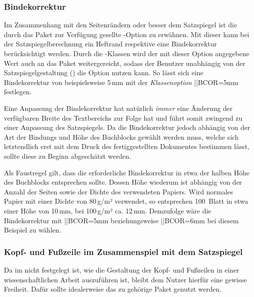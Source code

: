 \begin{DeclareEntity*}{}
\begin{DeclareEntity*}{}
\begin{DeclareEntity*}{}
\subsubsection{%
  Bindekorrektur%
}
%
Im Zusammenhang mit den Seitenrändern oder besser dem Satzspiegel ist die durch 
das Paket  zur Verfügung gesellte \KOMAScript-Option 
 zu erwähnen. Mit dieser kann bei 
der Satzspiegelberechnung ein Heftrand respektive eine Bindekorrektur 
berücksichtigt werden. Durch die \TUDScript-Klassen wird der mit dieser Option 
angegebene Wert auch an das Paket  weitergereicht, sodass der 
Benutzer unabhängig von der Satzspiegelgestaltung () die 
Option  nutzen kann. So lässt sich eine Bindekorrektur von 
beispielsweise 5\,mm mit der \emph{Klassenoption} \Option||{BCOR=5mm} 
festlegen.

Eine Anpassung der Bindekorrektur hat natürlich \emph{immer} eine Änderung der 
verfügbaren Breite des Textbereichs zur Folge hat und führt somit zwingend zu 
einer Anpassung des Satzspiegels. Da die Bindekorrektur jedoch abhängig von der 
Art der Bindungs und Höhe des Buchblocks gewählt werden muss, welche sich 
letztendlich erst mit dem Druck des fertiggestellten Dokumentes bestimmen 
lässt, sollte diese zu Beginn abgeschätzt werden.
%
\begin{Example}
Als Faustregel gilt, dass die erforderliche Bindekorrektur in etwa der halben 
Höhe des Buchblocks entsprechen sollte. Dessen Höhe wiederum ist abhängig von 
der Anzahl der Seiten sowie der Dichte des verwendeten Papiers. Wird normales 
Papier mit einer Dichte von 80\,g/m² verwendet, so entsprechen 100~Blatt 
in etwa einer Höhe von 10\,mm, bei 100\,g/m² ca. 12\,mm. Demzufolge wäre die 
Bindekorrektur mit \Option||{BCOR=5mm} beziehungsweise \Option||{BCOR=6mm} bei 
diesem Beispiel zu wählen.%
\end{Example}



\subsubsection{%
  Kopf- und Fußzeile im Zusammenspiel mit dem Satzspiegel%
}
%
Da im \CD nicht festgelegt ist, wie die Gestaltung der Kopf- und Fußzeilen in 
einer wissenschaftlichen Arbeit auszuführen ist, bleibt dem Nutzer hierfür eine 
gewisse Freiheit. Dafür sollte idealerweise das zu \KOMAScript gehörige Paket 
 genutzt werden. 


\end{DeclareEntity*}
\end{DeclareEntity*}
\end{DeclareEntity*}
